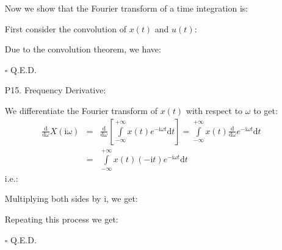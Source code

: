 \begin{itemize}
	Now we show that the Fourier transform of a time integration is:
	
	
	\begin{dem}
	
	First consider the convolution of $x(t)$ and $u(t)$:
	
	Due to the convolution theorem, we have:
	
	\begin{flushright}
		$\square$  Q.E.D.
	\end{flushright}
	\end{dem}
	
	\item[P15.] Frequency Derivative:
	
	\begin{dem} We differentiate the Fourier transform of $x(t)$ with
	respect to $\omega$ to get:
	\begin{eqnarray}
		\frac{\mathrm{d}}{\mathrm{d}\omega}X(\mathrm{i}\omega)&=&\frac{\mathrm{d}}{\mathrm{d}\omega}\left[\int\limits_{-\infty}^{+\infty} 
		x(t)e^{-\mathrm{i}\omega t}\mathrm{d}t\right]
		=\int\limits_{-\infty}^{+\infty} x(t)\frac{\mathrm{d}}{\mathrm{d}\omega}e^{-\mathrm{i}\omega t}\mathrm{d}t
		\nonumber \\
	&=& \int\limits_{-\infty}^{+\infty} x(t)(-\mathrm{i}t)e^{-\mathrm{i}\omega t}\mathrm{d}t
		\nonumber
	\end{eqnarray}
	i.e.:
	
	Multiplying both sides by $\mathrm{i}$, we get:
	
	Repeating this process we get:
	
	\begin{flushright}
		$\square$  Q.E.D.
	\end{flushright}
	\end{dem}
	
	\end{itemize}
	
